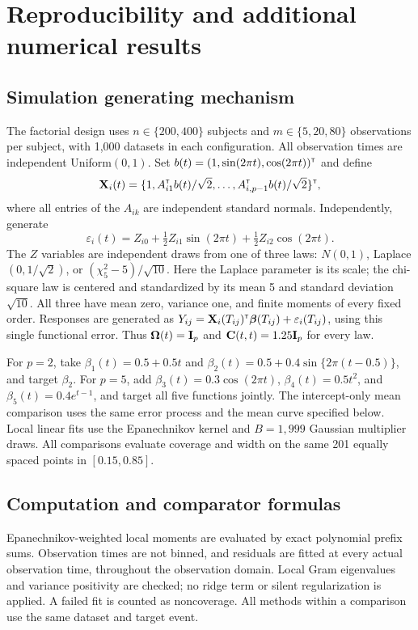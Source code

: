 \section{Reproducibility and additional numerical results}\label{app:numerics}

\subsection{Simulation generating mechanism}\label{app:simulation-design}

The factorial design uses $n\in\{200,400\}$ subjects and $m\in\{5,20,80\}$ observations per subject, with 1,000 datasets in each configuration. All observation times are independent Uniform$(0,1)$. Set $b(t)=(1,\sin(2\pi t),\cos(2\pi t))^{\scriptscriptstyle\mathsf{T}}$ and define
\[
{\mathbf X}_i(t)=\{1,A_{i1}^{\scriptscriptstyle\mathsf{T}} b(t)/\sqrt2,\ldots,
A_{i,p-1}^{\scriptscriptstyle\mathsf{T}} b(t)/\sqrt2\}^{\scriptscriptstyle\mathsf{T}},
\]
where all entries of the $A_{ik}$ are independent standard normals. Independently, generate
\[
\varepsilon_i(t)=Z_{i0}+\tfrac12Z_{i1}\sin(2\pi t)
+\tfrac12Z_{i2}\cos(2\pi t).
\]
The $Z$ variables are independent draws from one of three laws: $N(0,1)$, Laplace$(0,1/\sqrt2)$, or $(\chi^2_5-5)/\sqrt{10}$. Here the Laplace parameter is its scale; the chi-square law is centered and standardized by its mean 5 and standard deviation $\sqrt{10}$. All three have mean zero, variance one, and finite moments of every fixed order. Responses are generated as $Y_{ij}={\mathbf X}_i(T_{ij})^{\scriptscriptstyle\mathsf{T}}\boldsymbol{\beta}(T_{ij})+\varepsilon_i(T_{ij})$, using this single functional error. Thus $\boldsymbol{\Omega}(t)={\mathbf I}_p$ and ${\mathbf C}(t,t)=1.25{\mathbf I}_p$ for every law.

For $p=2$, take $\beta_1(t)=0.5+0.5t$ and $\beta_2(t)=0.5+0.4\sin\{2\pi(t-0.5)\}$, and target $\beta_2$. For $p=5$, add $\beta_3(t)=0.3\cos(2\pi t)$, $\beta_4(t)=0.5t^2$, and $\beta_5(t)=0.4e^{t-1}$, and target all five functions jointly. The intercept-only mean comparison uses the same error process and the mean curve specified below. Local linear fits use the Epanechnikov kernel and $B=1{,}999$ Gaussian multiplier draws. All comparisons evaluate coverage and width on the same 201 equally spaced points in $[0.15,0.85]$.

\subsection{Computation and comparator formulas}\label{app:comparator-formulas}

Epanechnikov-weighted local moments are evaluated by exact polynomial prefix sums. Observation times are not binned, and residuals are fitted at every actual observation time, throughout the observation domain. Local Gram eigenvalues and variance positivity are checked; no ridge term or silent regularization is applied. A failed fit is counted as noncoverage. All methods within a comparison use the same dataset and target event.

